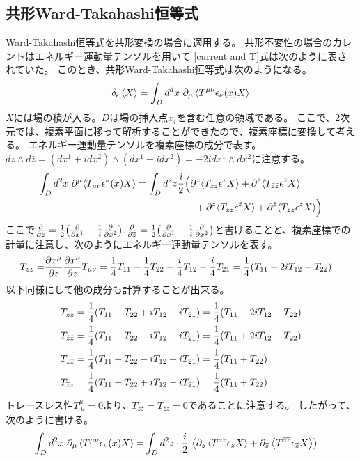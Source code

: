 \documentclass[11pt, dvipdfmx]{article}
\numberwithin{equation}{section}
\begin{document}
\subsection{共形Ward-Takahashi恒等式}
Ward-Takahashi恒等式を共形変換の場合に適用する。
共形不変性の場合のカレントはエネルギー運動量テンソルを用いて
\eqref{current and T}式は次のように表されていた。
このとき、共形Ward-Takahashi恒等式は次のようになる。
\begin{align}
   \delta_{\epsilon}\ev{X}=\int_D d^dx \ \partial_\mu \ev{T^{\mu\nu}\epsilon_\nu (x)X}
\end{align}
$X$には場の積が入る。$D$は場の挿入点$x_i$を含む任意の領域である。
ここで、2次元では、複素平面に移って解析することができたので、複素座標に変換して考える。
エネルギー運動量テンソルを複素座標の成分で表す。$dz\wedge d\overline{z}=(dx^1 +idx^2)\wedge(dx^1-idx^2) =-2idx^1\wedge dx^2
$に注意する。
\begin{align}
\int_D d^2x \ \partial^\mu \langle T_{\mu\nu}\epsilon^\nu (x)X \rangle 
&= \int_D d^2z \frac{i}{2} \Big(
    \partial^z \langle T_{zz}\epsilon^z X \rangle 
    + \partial^{\bar{z}} \langle T_{\bar{z}\bar{z}}\epsilon^{\bar{z}} X \rangle \notag\\
&\hspace{6em} + \partial^z \langle T_{z\bar{z}}\epsilon^{\bar{z}} X \rangle 
    + \partial^{\bar{z}} \langle T_{\bar{z}z}\epsilon^z X \rangle
\Big)
\end{align}
ここで$\frac{\partial}{\partial z}=\frac{1}{2}\qty(\pdv{x^1}+\frac{1}{i}\pdv{x^2})$,$\frac{\partial}{\partial \overline{z}}=\frac{1}{2}\qty(\pdv{x^1}-\frac{1}{i}\pdv{x^2})$と書けることと、複素座標での計量に注意し、次のようにエネルギー運動量テンソルを表す。
\begin{align}
    T_{zz}=&\pdv{x^\mu}{z}\pdv{x^\nu}{z}T_{\mu\nu}=\frac{1}{4}T_{11}-\frac{1}{4}T_{22}-\frac{i}{4}T_{12}-\frac{i}{4}T_{21}=\frac{1}{4}(T_{11}-2iT_{12}-T_{22})
\end{align}
以下同様にして他の成分も計算することが出来る。
\begin{align}
    T_{zz}&=\frac{1}{4}\qty(T_{11}-T_{22}+iT_{12}+iT_{21})=\frac{1}{4}(T_{11}-2iT_{12}-T_{22})\\
    T_{\overline{z}\overline{z}}&=\frac{1}{4}\qty(T_{11}-T_{22}-iT_{12}-iT_{21})=\frac{1}{4}(T_{11}+2iT_{12}-T_{22})\\
    T_{z\overline{z}}&=\frac{1}{4}\qty(T_{11}+T_{22}-iT_{12}+iT_{21})=\frac{1}{4}(T_{11}+T_{22})\\
    T_{\overline{z}z}&=\frac{1}{4}\qty(T_{11}+T_{22}+iT_{12}-iT_{21})=\frac{1}{4}(T_{11}+T_{22})
\end{align}
トレースレス性$T^\mu_{\ \mu}=0$より、$T_{z\overline{z}}=T_{\overline{z}z}=0$であることに注意する。
したがって、次のように書ける。
\begin{align}
    \int_D d^2x \ \partial_\mu \ev{T^{\mu\nu}\epsilon_\nu (x)X}=&\int_D d^2z\cdot \frac{i}{2} \ \qty(\partial_z \ev{T^{zz}\epsilon_zX}+\partial_{\overline{z}} \ev{T^{\overline{z}\overline{z}} \epsilon_{\overline{z}} X})
\end{align}
\end{document}
